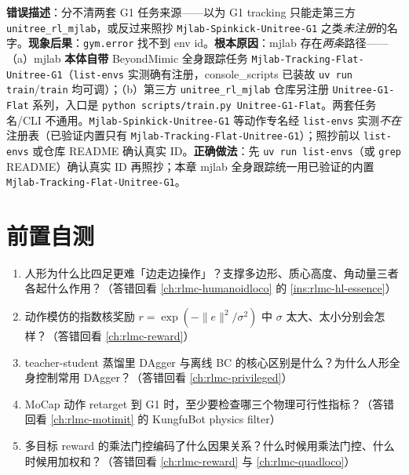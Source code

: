 \begin{pitfall}
\textbf{错误描述}：分不清两套 G1 任务来源——以为 G1 tracking 只能走第三方 \texttt{unitree\_rl\_mjlab}，或反过来照抄 \texttt{Mjlab-Spinkick-Unitree-G1} 之类\emph{未注册}的名字。\textbf{现象后果}：\verb|gym.error| 找不到 env id。\textbf{根本原因}：mjlab 存在\emph{两条}路径——（a）mjlab \textbf{本体自带} BeyondMimic 全身跟踪任务 \texttt{Mjlab-Tracking-Flat-Unitree-G1}（\texttt{list-envs} 实测确有注册，console\_scripts 已装故 \texttt{uv run train}/\allowbreak\texttt{train} 均可调）；（b）第三方 \texttt{unitree\_rl\_mjlab} 仓库另注册 \texttt{Unitree-G1-Flat} 系列，入口是 \texttt{python scripts/\allowbreak train.\allowbreak py Unitree-G1-Flat}。两套任务名/CLI 不通用。\texttt{Mjlab-Spinkick-Unitree-G1} 等动作专名经 \texttt{list-envs} 实测\emph{不在}注册表（已验证内置只有 \texttt{Mjlab-Tracking-Flat-Unitree-G1}）；照抄前以 \texttt{list-envs} 或仓库 README 确认真实 ID。\textbf{正确做法}：先 \texttt{uv run list-envs}（或 \texttt{grep} README）确认真实 ID 再照抄；本章 mjlab 全身跟踪统一用已验证的内置 \texttt{Mjlab-Tracking-Flat-Unitree-G1}。
\end{pitfall}

\section*{前置自测}

\begin{practice}
\begin{enumerate}
  \item 人形为什么比四足更难「边走边操作」？支撑多边形、质心高度、角动量三者各起什么作用？（答错回看 \cref{ch:rlmc-humanoidloco} 的 \cref{ins:rlmc-hl-essence}）
  \item 动作模仿的指数核奖励 $r=\exp(-\lVert e\rVert^2/\sigma^2)$ 中 $\sigma$ 太大、太小分别会怎样？（答错回看 \cref{ch:rlmc-reward}）
  \item teacher-student 蒸馏里 DAgger 与离线 BC 的核心区别是什么？为什么人形全身控制常用 DAgger？（答错回看 \cref{ch:rlmc-privileged}）
  \item MoCap 动作 retarget 到 G1 时，至少要检查哪三个物理可行性指标？（答错回看 \cref{ch:rlmc-motimit} 的 KungfuBot physics filter）
  \item 多目标 reward 的乘法门控编码了什么因果关系？什么时候用乘法门控、什么时候用加权和？（答错回看 \cref{ch:rlmc-reward} 与 \cref{ch:rlmc-quadloco}）
\end{enumerate}
\end{practice}

